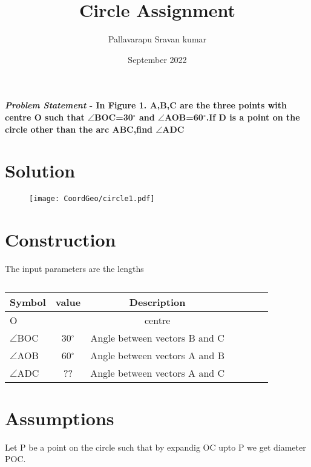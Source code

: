 \documentclass[journal,10pt,twocolumn]{article}
\title{\textbf{Circle Assignment}}
\author{Pallavarapu Sravan kumar}
\date{September 2022}
\begin{document}
\maketitle
\paragraph{\textit{\large Problem Statement} - In Figure 1. A,B,C are the three points with centre O such that $\angle$BOC=30$^\circ$ and $\angle$AOB=60$^\circ$.If D is a point on the circle other than the arc ABC,find $\angle$ADC}
\section*{\large Solution}
\begin{figure}[H]
\centering
\texttt{[image: CoordGeo/circle1.pdf]}
\caption{}
\end{figure}

\section*{\large Construction}



The input parameters are the lengths



\begin{table}[htbp]
 \begin{center}
    \begin{tabular}{|l|c|c|c|c|c|c} \hline \textbf{Symbol}
  & \textbf{value} & \textbf{Description} \\
 \hline
O & & centre \\ \hline
$\angle$BOC &30$^\circ$ & Angle between vectors B and C  \\ \hline
$\angle$AOB&60$^\circ$&Angle between vectors A and B\\
	\hline
	$\angle$ADC&??&Angle between vectors A and C \\
	\hline
\end{tabular}   
\end{center}
\caption{\label{table:dummytable} }
\end{table}

\vspace*{10mm}

\section*{\large Assumptions}
Let P be a point on the circle such that by expandig OC upto P we get diameter POC.
\end{document}
